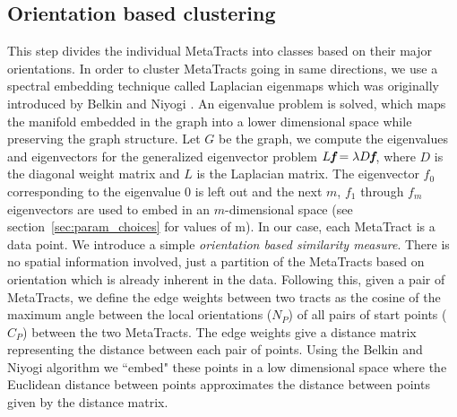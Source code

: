 \subsection {Orientation based clustering}
This step divides the individual MetaTracts into classes based on their major orientations. In order to cluster MetaTracts going in same directions, we use a spectral embedding technique called Laplacian eigenmaps which was originally introduced by Belkin and Niyogi \cite{Belkin01}. An eigenvalue problem is solved, which maps the manifold embedded in the graph into a lower dimensional space while preserving the graph structure.
Let $G$ be the graph, we compute the eigenvalues and eigenvectors for the generalized eigenvector problem $L\textit{\textbf{f}}=\lambda D\textit{\textbf{f}}$,
where $D$ is the diagonal weight matrix and $L$ is the Laplacian matrix. The eigenvector \textbf{${f}_{0}$} corresponding to the eigenvalue 0 is left out and the next $m$, {\textbf{${f}_{1}$} through \textbf{${f}_{m}$}} eigenvectors are used to embed in an $m$-dimensional space (see section~\ref{sec:param_choices} for values of m).
 In our case, each MetaTract is a data point. We introduce a simple \textit{orientation based similarity measure}. There is no spatial information involved, just a partition of the MetaTracts based on orientation which is already inherent in the data.
Following this, given a pair of  MetaTracts, we define the edge weights between two tracts as the cosine of the maximum angle between the local orientations ($N_P$) of all pairs of start points ($C_P$) between the two MetaTracts. The edge weights give a distance matrix representing the distance between each pair of points. Using the Belkin and Niyogi algorithm we ``embed" these points in a low dimensional space where the Euclidean distance between points approximates the distance between points given by the distance matrix. 
%
